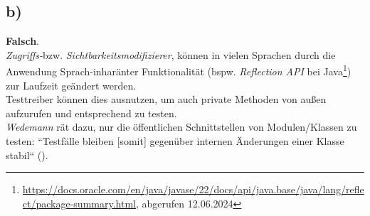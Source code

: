 \subsection*{b)}



\textbf{Falsch}.\\
\textit{Zugriffs-}bzw. \textit{Sichtbarkeitsmodifizierer}, können in vielen Sprachen durch die Anwendung Sprach-inharänter Funktionalität (bspw. \textit{Reflection API} bei Java\footnote{
\url{https://docs.oracle.com/en/java/javase/22/docs/api/java.base/java/lang/reflect/package-summary.html}, abgerufen 12.06.2024
}) zur Laufzeit geändert werden.\\
Testtreiber können dies ausnutzen, um auch private Methoden von außen aufzurufen und entsprechend zu testen.\\

\noindent
\textit{Wedemann} rät dazu, nur die öffentlichen Schnittstellen von Modulen/Klassen zu testen: ``Testfälle bleiben [somit] gegenüber internen Änderungen einer Klasse stabil`` (\cite[56]{Wed09c}).
